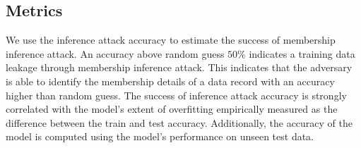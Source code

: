 \subsection{Metrics}

We use the inference attack accuracy to estimate the success of membership inference attack.
An accuracy above random guess $50\%$ indicates a training data leakage through membership inference attack.
This indicates that the adversary is able to identify the membership details of a data record with an accuracy higher than random guess.
The success of inference attack accuracy is strongly correlated with the model's extent of overfitting empirically measured as the difference between the train and test accuracy.
Additionally, the accuracy of the model is computed using the model's performance on unseen test data.
